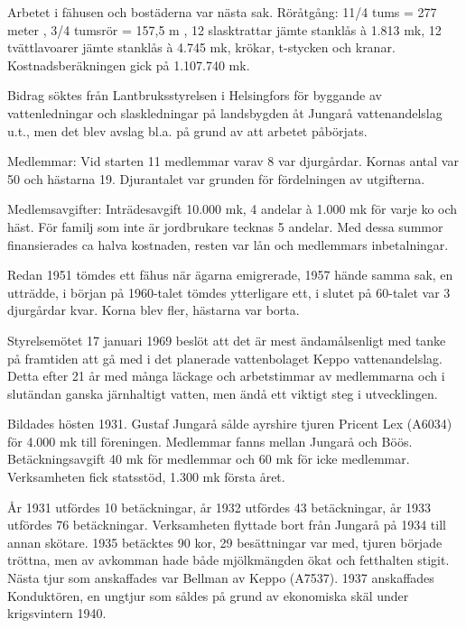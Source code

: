 Arbetet i fähusen och bostäderna var nästa sak. Röråtgång: 11/4 tums = 277 meter , 3/4 tumsrör = 157,5 m , 12 slasktrattar jämte stanklås à 1.813 mk, 12 tvättlavoarer jämte stanklås à 4.745 mk, krökar, t-stycken och kranar. Kostnadsberäkningen gick på 1.107.740 mk.

Bidrag söktes från Lantbruksstyrelsen i Helsingfors för byggande av vattenledningar och slaskledningar på landsbygden åt Jungarå vattenandelslag u.t.,  men det blev avslag bl.a. på grund av att arbetet påbörjats.

Medlemmar: Vid starten 11 medlemmar varav 8 var djurgårdar. Kornas antal var 50 och hästarna 19. Djurantalet var grunden för fördelningen av utgifterna.

Medlemsavgifter: Inträdesavgift 10.000 mk, 4 andelar à 1.000 mk för varje ko och häst. För familj som inte är jordbrukare tecknas 5 andelar. Med dessa summor finansierades ca halva kostnaden, resten var lån och medlemmars inbetalningar.

Redan 1951 tömdes ett fähus när ägarna emigrerade, 1957 hände samma sak, en utträdde, i början på 1960-talet tömdes ytterligare ett, i slutet  på  60-talet var 3 djurgårdar kvar. Korna blev fler, hästarna var borta.

Styrelsemötet 17 januari 1969 beslöt att det är mest ändamålsenligt med tanke på framtiden att gå med i det planerade vattenbolaget Keppo vattenandelslag. Detta efter 21 år med många läckage och arbetstimmar av medlemmarna och i slutändan ganska järnhaltigt vatten, men ändå ett viktigt steg i utvecklingen.




%


Bildades hösten 1931. Gustaf Jungarå sålde ayrshire tjuren Pricent Lex (A6034) för 4.000 mk till 	föreningen. Medlemmar fanns mellan Jungarå och Böös. Betäckningsavgift 40 mk för medlemmar och 60 mk för icke	medlemmar. Verksamheten fick statsstöd, 1.300 mk första året.

År 1931 utfördes 10 betäckningar, år 1932 utfördes 43 betäckningar, år 1933 utfördes 76 betäckningar. 	Verksamheten flyttade bort från Jungarå på 1934 till annan skötare. 1935 betäcktes 90 kor, 29 besättningar var med, tjuren började tröttna, men av avkomman hade både mjölkmängden ökat och fetthalten stigit. Nästa tjur som anskaffades var Bellman av Keppo (A7537). 1937 anskaffades Konduktören,  en ungtjur som såldes på grund av ekonomiska skäl under krigsvintern 1940.

